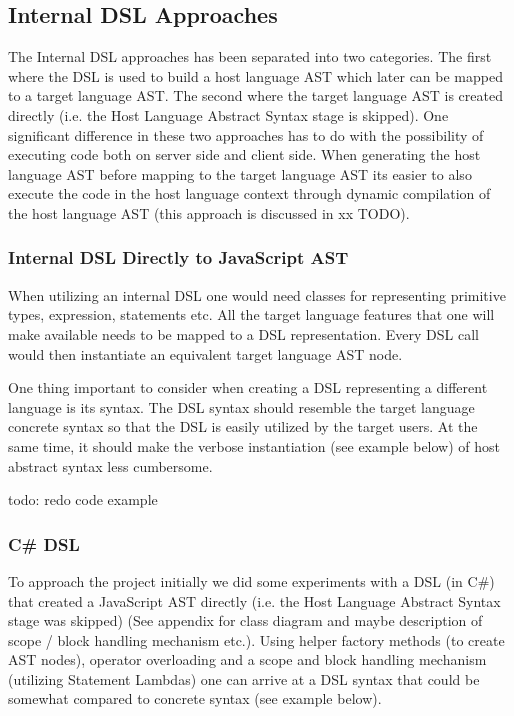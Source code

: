 	\subsection{Internal DSL Approaches} %
	\label{ssub:internal_dsl_approaches}

		The Internal DSL approaches has been separated into two categories. The first where the DSL is used to build a host language AST which later can be mapped to a target language AST. The second where the target language AST is created directly (i.e. the Host Language Abstract Syntax stage is skipped). One significant difference in these two approaches has to do with the possibility of executing code both on server side and client side. When generating the host language AST before mapping to the target language AST its easier to also execute the code in the host language context through dynamic compilation of the host language AST (this approach is discussed in xx TODO).
	
		\subsubsection{Internal DSL Directly to JavaScript AST} %
		\label{sub:internal_dsl_directly_to_javascript_ast}
		
			When utilizing an internal DSL one would need classes for representing primitive types, expression, statements etc. All the target language features that one will make available needs to be mapped to a DSL representation. Every DSL call would then instantiate an equivalent target language AST node.

			One thing important to consider when creating a DSL representing a different language is its syntax. The DSL syntax should resemble the target language concrete syntax so that the DSL is easily utilized by the target users. At the same time, it should make the verbose instantiation (see example below) of host abstract syntax less cumbersome.

			todo: redo code example


		\subsubsection{C\# DSL} %
		\label{sub:cs_dsl}

			To approach the project initially we did some experiments with a DSL (in C\#) that created a JavaScript AST directly (i.e. the Host Language Abstract Syntax stage was skipped) (See appendix for class diagram and maybe description of scope / block handling mechanism etc.). Using helper factory methods (to create AST nodes), operator overloading and a scope and block handling mechanism (utilizing Statement Lambdas) one can arrive at a DSL syntax that could be somewhat compared to concrete syntax (see example below).

